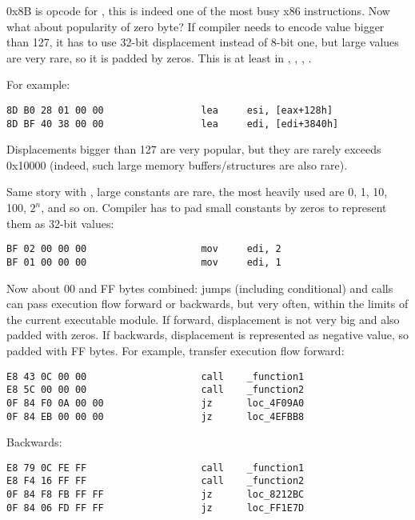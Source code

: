 0x8B is opcode for , this is indeed one of the most busy x86 instructions.
Now what about popularity of zero byte?
If compiler needs to encode value bigger than 127, it has to use 32-bit displacement instead of 8-bit one, but large values are very rare,
so it is padded by zeros.
This is at least in , , , .

For example:

\begin{lstlisting}
8D B0 28 01 00 00                 lea     esi, [eax+128h]
8D BF 40 38 00 00                 lea     edi, [edi+3840h]
\end{lstlisting}

Displacements bigger than 127 are very popular, but they are rarely exceeds 0x10000
(indeed, such large memory buffers/structures are also rare).

Same story with , large constants are rare, the most heavily used are 0, 1, 10, 100, $2^n$, and so on.
Compiler has to pad small constants by zeros to represent them as 32-bit values:

\begin{lstlisting}
BF 02 00 00 00                    mov     edi, 2
BF 01 00 00 00                    mov     edi, 1
\end{lstlisting}

Now about 00 and FF bytes combined: jumps (including conditional) and calls can pass execution flow forward or backwards, but very often,
within the limits of the current executable module.
If forward, displacement is not very big and also padded with zeros.
If backwards, displacement is represented as negative value, so padded with FF bytes.
For example, transfer execution flow forward:

\begin{lstlisting}
E8 43 0C 00 00                    call    _function1
E8 5C 00 00 00                    call    _function2
0F 84 F0 0A 00 00                 jz      loc_4F09A0
0F 84 EB 00 00 00                 jz      loc_4EFBB8
\end{lstlisting}

Backwards:

\begin{lstlisting}
E8 79 0C FE FF                    call    _function1
E8 F4 16 FF FF                    call    _function2
0F 84 F8 FB FF FF                 jz      loc_8212BC
0F 84 06 FD FF FF                 jz      loc_FF1E7D
\end{lstlisting}

